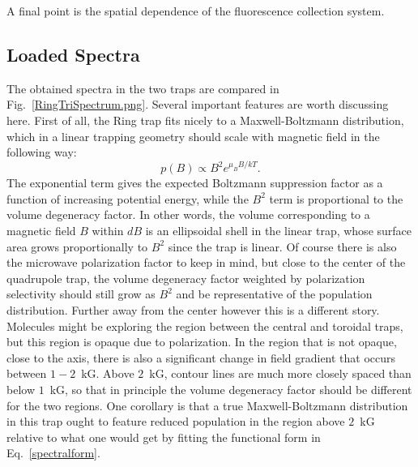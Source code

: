 \documentclass[defaultstyle,11pt]{thesis}
\begin{document}

A final point is the spatial dependence of the fluorescence collection system. 

\subsection{Loaded Spectra}

The obtained spectra in the two traps are compared in Fig.~\ref{RingTriSpectrum.png}.
Several important features are worth discussing here.
First of all, the Ring trap fits nicely to a Maxwell-Boltzmann distribution, which in a linear trapping geometry should scale with magnetic field in the following way:
\begin{equation}
\label{spectralform}
p(B)\propto B^2e^{\mu_B B/kT}.
\end{equation}
The exponential term gives the expected Boltzmann suppression factor as a function of increasing potential energy, while the $B^2$ term is proportional to the volume degeneracy factor.
In other words, the volume corresponding to a magnetic field $B$ within $dB$ is an ellipsoidal shell in the linear trap, whose surface area grows proportionally to $B^2$ since the trap is linear.
Of course there is also the microwave polarization factor to keep in mind, but close to the center of the quadrupole trap, the volume degeneracy factor weighted by polarization selectivity should still grow as $B^2$ and be representative of the population distribution.
Further away from the center however this is a different story.
Molecules might be exploring the region between the central and toroidal traps, but this region is opaque due to polarization.
In the region that is not opaque, close to the axis, there is also a significant change in field gradient that occurs between $1-2$~kG. Above $2$~kG, contour lines are much more closely spaced than below $1$~kG, so that in principle the volume degeneracy factor should be different for the two regions.
One corollary is that a true Maxwell-Boltzmann distribution in this trap ought to feature reduced population in the region above $2$~kG relative to what one would get by fitting the functional form in Eq.~\ref{spectralform}.
\end{document}
